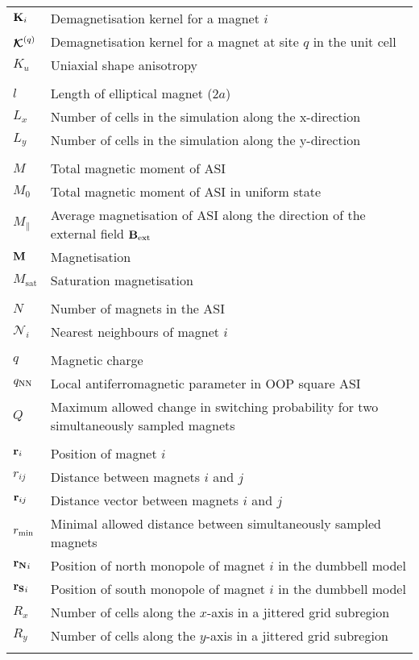 \begin{longtable}[l]{p{60pt} p{350pt}}
	$\boldsymbol{\mathbf{K}}_i$ & Demagnetisation kernel for a magnet $i$ \\
	$\boldsymbol{\mathbf{\mathcal{K}}}^{(q)}$ & Demagnetisation kernel for a magnet at site $q$ in the unit cell \\
	$K_u$ & Uniaxial shape anisotropy \\
	&\\

	$l$ & Length of elliptical magnet ($2a$) \\
	$L_x$ & Number of cells in the simulation along the x-direction \\
	$L_y$ & Number of cells in the simulation along the y-direction \\
	&\\

	$M$ & Total magnetic moment of ASI \\
	$M_0$ & Total magnetic moment of ASI in uniform state \\
	$M_\parallel$ & Average magnetisation of ASI along the direction of the external field $\boldsymbol{\mathbf{B}}_\mathrm{ext}$ \\
	$\boldsymbol{\mathbf{M}}$ & Magnetisation \\
	$M_\mathrm{sat}$ & Saturation magnetisation \\
	&\\

	$N$ & Number of magnets in the ASI \\ %
	$\mathcal{N}_i$ & Nearest neighbours of magnet $i$ \\
	&\\

	$q$ & Magnetic charge \\
	$q_\mathrm{NN}$ & Local antiferromagnetic parameter in OOP square ASI \\
	$Q$ & Maximum allowed change in switching probability for two simultaneously sampled magnets \\
	&\\

	$\boldsymbol{\mathbf{r}}_i$ & Position of magnet $i$ \\
	$r_{ij}$ & Distance between magnets $i$ and $j$ \\
	$\boldsymbol{\mathbf{r}}_{ij}$ & Distance vector between magnets $i$ and $j$ \\
	$r_\mathrm{min}$ & Minimal allowed distance between simultaneously sampled magnets \\
	$\boldsymbol{\mathbf{r_N}}_i$ & Position of north monopole of magnet $i$ in the dumbbell model \\
	$\boldsymbol{\mathbf{r_S}}_i$ & Position of south monopole of magnet $i$ in the dumbbell model \\
	$R_x$ & Number of cells along the $x$-axis in a jittered grid subregion \\
	$R_y$ & Number of cells along the $y$-axis in a jittered grid subregion \\
	&\\


\end{longtable}
